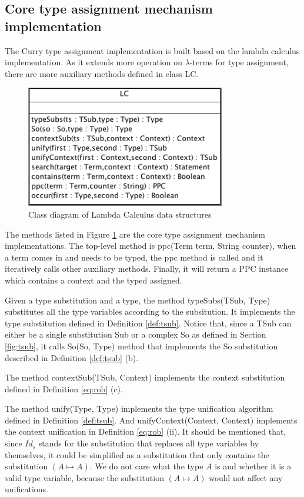 \subsection{Core type assignment mechanism implementation}

The Curry type assignment implementation is built based on the lambda calculus implementation. As it extends more operation on $\lambda$-terms for type assignment, there are more auxiliary methods defined in class \textsf{LC}. 

\begin{figure}[ht]
\centering
\includegraphics[scale=0.6]{pics/LCType}
\caption{Class diagram of Lambda Calculus data structures}
\label{fig:lctype}
\end{figure}


The methods listed in Figure \ref{fig:lctype} are the core type assignment mechanism implementations. The top-level method is \textsf{ppc(Term term, String counter)}, when a term comes in and needs to be typed, the ppc method is called and it iteratively calls other auxiliary methods. Finally, it will return a \textsf{PPC} instance which contains a context and the typed assigned. 

Given a type substitution and a type, the method \textsf{typeSubs(TSub, Type)} substitutes all the type variables according to the subsitution. It implements the type substitution defined in Definition \ref{def:tsub}. Notice that, since a \textsf{TSub} can either be a single substitution \textsf{Sub} or a complex \textsf{So} as defined in Section \ref{fig:tsub}, it calls \textsf{So(So, Type)} method that implements the \textsf{So} substitution described in Definition \ref{def:tsub} (b). 

The method \textsf{contextSub(TSub, Context)} implements the context substitution defined in Definition \ref{eq:rob} (c). 

The method \textsf{unify(Type, Type)} implements the type unification algorithm defined in Definition \ref{def:tsub}. And \textsf{unifyContext(Context, Context)} implements the context unification in Definition \ref{eq:rob} (ii). It should be mentioned that, since $Id_s$ stands for the substitution that replaces all type variables by themselves, it could be simplified as a substitution that only contains the substitution $(A\mapsto A)$. We do not care what the type $A$ is and whether it is a valid type variable, because the substitution $(A\mapsto A)$ would not affect any unifications. 

